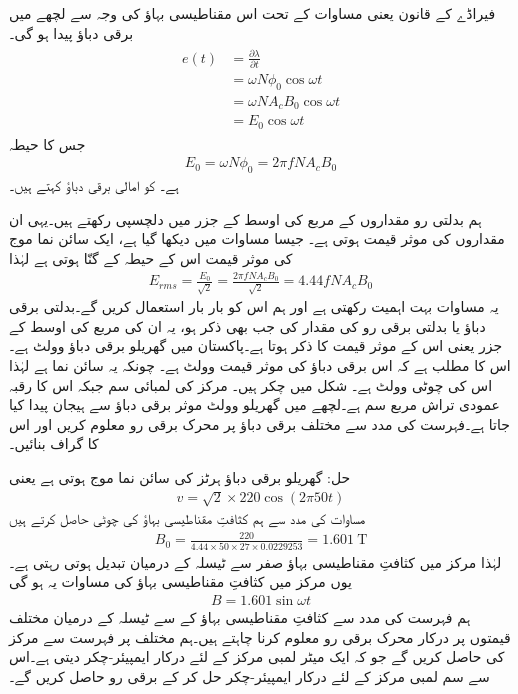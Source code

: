 فیراڈے کے قانون یعنی مساوات  کے تحت اس مقناطیسی بہاؤ کی وجہ سے لچھے میں  برقی دباؤ  پیدا ہو گی۔
\begin{gather}
\begin{aligned}
e(t)&=\frac{\partial \lambda}{\partial t}\\
&=\omega N \phi_0 \cos \omega t \\
&=\omega N A_c B_0 \cos \omega t\\
&=E_0 \cos \omega t
\end{aligned}
\end{gather}
جس کا حیطہ
\begin{align}
E_0=\omega N \phi_0=2 \pi f N A_c B_0
\end{align}
ہے۔ کو امالی برقی دباؤ کہتے ہیں۔ 

ہم بدلتی رو مقداروں کے مربع کی اوسط کے جزر  میں دلچسپی رکھتے ہیں۔یہی ان مقداروں کی موثر قیمت ہوتی ہے۔ جیسا مساوات  میں دیکھا گیا ہے، ایک سائن نما  موج کی موثر قیمت اس کے حیطہ کے   گنّا ہوتی ہے لہٰذا 
\begin{align}
E_{rms}=\frac{E_0}{\sqrt{2}}=\frac{2 \pi f N A_c B_0}{\sqrt{2}}=4.44 f N A_c B_0
\end{align}
یہ مساوات بہت اہمیت رکھتی ہے اور ہم اس کو بار بار استعمال کریں گے۔بدلتی برقی دباؤ یا بدلتی برقی رو کی مقدار کی جب بھی ذکر ہو، یہ ان کی مربع کی اوسط کے جزر  یعنی اس کے موثر قیمت  کا ذکر ہوتا ہے۔پاکستان میں گھریلو برقی دباؤ  وولٹ ہے۔اس کا مطلب ہے کہ اس برقی دباؤ کی موثر قیمت  وولٹ ہے۔ چونکہ یہ سائن نما ہے لہٰذا اس کی چوٹی  وولٹ ہے۔
%
شکل میں  چکر ہیں۔ مرکز کی لمبائی  سم جبکہ اس کا رقبہ عمودی تراش  مربع سم ہے۔لچھے  میں گھریلو  وولٹ موثر برقی دباؤ سے ہیجان  پیدا کیا جاتا ہے۔فہرست کی مدد سے مختلف برقی دباؤ پر محرک برقی رو معلوم کریں اور اس کا گراف بنائیں۔

حل:
	گھریلو برقی دباؤ  ہرٹز کی سائن نما موج ہوتی ہے یعنی
\begin{align}
v=\sqrt{2} \times 220 \cos (2 \pi  50 t)
\end{align}
مساوات  کی مدد سے ہم کثافتِ مقناطیسی بہاؤ کی چوٹی حاصل کرتے ہیں
\begin{align}
B_0=\frac{220}{4.44 \times 50 \times 27 \times 0.0229253}=\SI{1.601}{\tesla}
\end{align}
لہٰذا مرکز میں کثافتِ مقناطیسی بہاؤ صفر سے   ٹیسلہ کے درمیان تبدیل ہوتی رہتی ہے۔یوں مرکز میں کثافتِ مقناطیسی بہاؤ کی مساوات یہ ہو گی
\begin{align}
B=1.601 \sin \omega t
\end{align}
ہم فہرست کی مدد سے کثافتِ مقناطیسی بہاؤ کے   سے  ٹیسلہ کے درمیان مختلف قیمتوں پر درکار محرک برقی رو  معلوم کرنا چاہتے ہیں۔ہم مختلف  پر فہرست سے مرکز کی  حاصل کریں گے جو کہ ایک میٹر لمبی مرکز کے لئے درکار ایمپیئر-چکر دیتی ہے۔اس سے  سم لمبی مرکز کے لئے درکار ایمپیئر-چکر  حل کر کے برقی رو حاصل کریں گے۔

